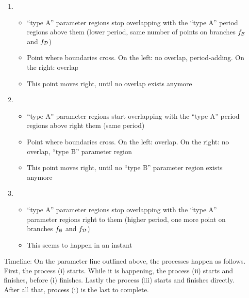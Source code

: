 \begin{enumerate}
    \item \begin{itemize}
              \item ``type A'' parameter regions stop overlapping with the ``type A'' period regions above them (lower period, same number of points on branches $f_{\mathcal{B}}$ and $f_{\mathcal{D}}$)
              \item Point where boundaries cross. On the left: no overlap, period-adding. On the right: overlap
              \item This point moves right, until no overlap exists anymore
          \end{itemize}
    \item \begin{itemize}
              \item ``type A'' parameter regions start overlapping with the ``type A'' period regions above right them (same period)
              \item Point where boundaries cross. On the left: overlap. On the right: no overlap, ``type B'' parameter region
              \item This point moves right, until no ``type B'' parameter region exists anymore
          \end{itemize}
    \item \begin{itemize}
              \item ``type A'' parameter regions stop overlapping with the ``type A'' parameter regions right to them (higher period, one more point on branches $f_{\mathcal{B}}$ and $f_{\mathcal{D}}$)
              \item This seems to happen in an instant
          \end{itemize}
\end{enumerate}

Timeline:
On the parameter line outlined above, the processes happen as follows.
First, the process (i) starts.
While it is happening, the process (ii) starts and finishes, before (i) finishes.
Lastly the process (iii) starts and finishes directly.
After all that, process (i) is the last to complete.



